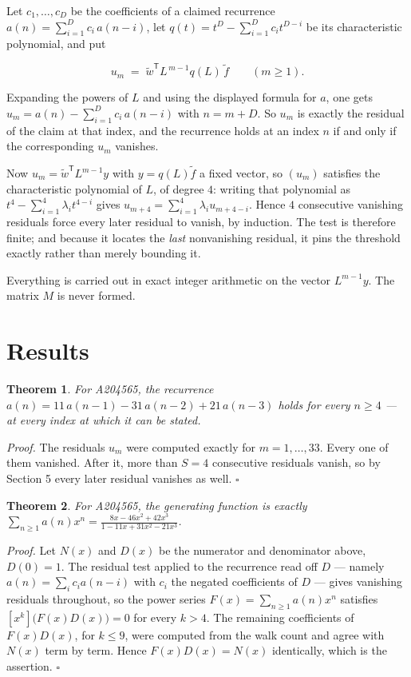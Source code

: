 \documentclass[11pt]{article}
\newtheorem{theorem}{Theorem}
\theoremstyle{definition}
\begin{document}
Let $c_1,\dots,c_D$ be the coefficients of a claimed recurrence $a(n) = \sum_{i=1}^{D} c_i\,a(n-i)$, let $q(t) = t^{D} - \sum_{i=1}^{D} c_i t^{D-i}$ be its characteristic polynomial, and put

\[u_m \;=\; \tilde w^{\mathsf T} L^{\,m-1} q(L)\,\tilde f \qquad (m \ge 1).\]

Expanding the powers of $L$ and using the displayed formula for $a$, one gets $u_m = a(n) - \sum_{i=1}^{D} c_i\,a(n-i)$ with $n = m + D$. So $u_m$ is exactly the residual of the claim at that index, and the recurrence holds at an index $n$ if and only if the corresponding $u_m$ vanishes.

Now $u_m = \tilde w^{\mathsf T} L^{m-1} y$ with $y = q(L)\tilde f$ a fixed vector, so $(u_m)$ satisfies the characteristic polynomial of $L$, of degree $4$: writing that polynomial as $t^{4} - \sum_{i=1}^{4} \lambda_i t^{4-i}$ gives $u_{m+4} = \sum_{i=1}^{4} \lambda_i u_{m+4-i}$. Hence $4$ consecutive vanishing residuals force every later residual to vanish, by induction. The test is therefore finite; and because it locates the {\itshape last} nonvanishing residual, it pins the threshold exactly rather than merely bounding it.

Everything is carried out in exact integer arithmetic on the vector $L^{m-1}y$. The matrix $M$ is never formed.

\section{Results}

\begin{theorem} For A204565, the recurrence $a(n) = 11\,a(n-1) - 31\,a(n-2) + 21\,a(n-3)$ holds for every $n \ge 4$ --- at every index at which it can be stated.\end{theorem}

{\itshape Proof.} The residuals $u_m$ were computed exactly for $m = 1,\dots,33$. Every one of them vanished. After it, more than $S = 4$ consecutive residuals vanish, so by Section 5 every later residual vanishes as well. $\square$

\begin{theorem} For A204565, the generating function is exactly $\sum_{n\ge 1} a(n)x^n = \frac{8x - 46x^{2} + 42x^{3}}{1 - 11x + 31x^{2} - 21x^{3}}$.\end{theorem}

{\itshape Proof.} Let $N(x)$ and $D(x)$ be the numerator and denominator above, $D(0)=1$. The residual test applied to the recurrence read off $D$ --- namely $a(n) = \sum_i c_i a(n-i)$ with $c_i$ the negated coefficients of $D$ --- gives vanishing residuals throughout, so the power series $F(x)=\sum_{n\ge 1}a(n)x^n$ satisfies $[x^k]\bigl(F(x)D(x)\bigr) = 0$ for every $k > 4$. The remaining coefficients of $F(x)D(x)$, for $k \le 9$, were computed from the walk count and agree with $N(x)$ term by term. Hence $F(x)D(x) = N(x)$ identically, which is the assertion. $\square$
\end{document}
